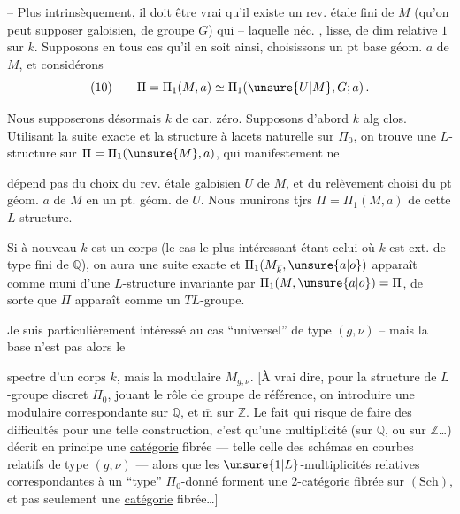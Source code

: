  -- Plus intrinsèquement, il doit être vrai qu'il existe un rev. étale fini de $M$ (qu'on peut supposer galoisien, de groupe $G$)  qui    -- laquelle  néc. , lisse, de dim relative $1$ sur $k$. Supposons en tous cas qu'il en soit ainsi, choisissons un pt base géom. $a$ de $M$, et considérons
\[
(10)\qquad \Pi=\Pi_1(M,a)\simeq\Pi_1(\unsure{U|M},G;a)\,.
\]

Nous supposerons désormais $k$ de car. zéro. Supposons d'abord $k$ alg clos. Utilisant la suite exacte
et la  structure à lacets naturelle sur $\Pi_0$, on trouve une $L$-structure sur $\Pi=\Pi_1(\unsure{M},a)$, qui manifestement ne

dépend pas du choix du rev. étale  galoisien $U$ de $M$, et du relèvement choisi du pt géom. $a$ de $M$ en un pt. géom. de $U$. Nous munirons tjrs  $\Pi=\Pi_1(M,a)$ de cette $L$-structure.

Si à nouveau $k$ est un corps  (le cas le plus intéressant étant celui où $k$ est ext. de type fini de $\mathbb{Q}$), on aura une suite exacte
et $\Pi_1(M_{\overline{k}},\unsure{a|o})$ apparaît comme muni d'une $L$-structure invariante par $\Pi_1(M,\unsure{a|o})=\Pi$, de sorte que $\Pi$ apparaît comme un $TL$-groupe.

Je suis particulièrement intéressé au cas ``universel'' de type $(g,\nu)$ -- mais la base  n'est pas alors le

spectre d'un corps $k$, mais la   modulaire $M_{g,\nu}$. [À vrai dire, pour la structure de $L$-groupe discret $\Pi_0$, jouant le rôle de groupe de référence, on   introduire une   modulaire correspondante sur $\mathbb{Q}$, et $\overline{\mathrm m}$ sur $\mathbb{Z}$. Le fait qui risque de faire des difficultés  pour une telle construction, c'est qu'une multiplicité  (sur $\mathbb{Q}$, ou sur $\mathbb{Z}$\ldots) décrit en principe une \uline{catégorie} fibrée --- telle celle des schémas en courbes relatifs de type $(g,\nu)$ --- alors que les $\unsure{1|L}$-multiplicités relatives correspondantes à un ``type'' $\Pi_0$-donné forment une \uline{2-catégorie}  fibrée sur $(\mathrm{Sch})$, et pas seulement une \uline{catégorie} fibrée\ldots]

